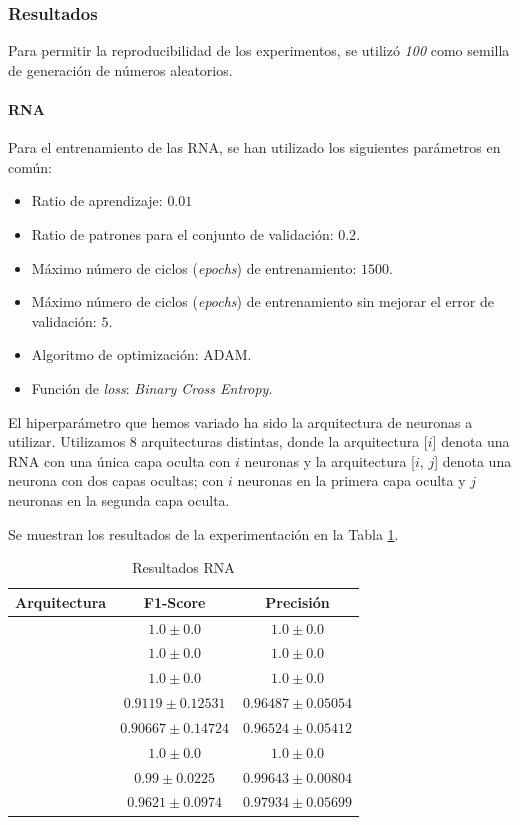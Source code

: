 \documentclass[12pt]{article}
\begin{document}
\subsubsection{Resultados}
Para permitir la reproducibilidad de los experimentos, se utilizó \textit{100} como semilla de generación de números
aleatorios.

\paragraph{RNA}

Para el entrenamiento de las RNA, se han utilizado los siguientes parámetros en común:
\begin{itemize}
	\item Ratio de aprendizaje: $0.01$
	\item Ratio de patrones para el conjunto de validación: $0.2$.
	\item Máximo número de ciclos (\textit{epochs}) de entrenamiento: $1500$.
	\item Máximo número de ciclos (\textit{epochs}) de entrenamiento sin mejorar el error de validación: $5$.
	\item Algoritmo de optimización: ADAM.
	\item Función de \textit{loss}: \textit{Binary Cross Entropy}.
\end{itemize}

El hiperparámetro que hemos variado ha sido la arquitectura de neuronas a utilizar.
Utilizamos 8 arquitecturas distintas,
donde la arquitectura [$i$] denota una RNA con una única capa oculta con $i$ neuronas y la arquitectura [$i$, $j$] 
denota una neurona con dos capas ocultas; con $i$ neuronas en la primera capa oculta y $j$ neuronas en la segunda capa oculta.

Se muestran los resultados de la experimentación en la Tabla \ref{Tab:ANN_1}.

\begin{table}[ht]
	\caption{Resultados RNA}
	\centering
		 \begin{tabular}{||c c c||}
			 \hline
			 Arquitectura & F1-Score & Precisión  \\ [0.5ex]
			 \hline\hline
			 [2] & $1.0 \pm 0.0$ & $1.0 \pm 0.0$ \\
			 \hline
			 [4] & $1.0 \pm 0.0$ & $1.0 \pm 0.0$ \\
			 \hline
			 [8] & $1.0 \pm 0.0$ & $1.0 \pm 0.0$ \\
			 \hline
			 [2, 4] & $0.9119 \pm 0.12531$ & $0.96487 \pm 0.05054$ \\
			 \hline
			 [2, 8] & $0.90667 \pm 0.14724$ & $0.96524 \pm 0.05412$ \\
			 \hline
			 [4, 2] & $1.0 \pm 0.0$ & $1.0 \pm 0.0$ \\
			 \hline
			 [4, 4] & $0.99 \pm 0.0225$ & $0.99643 \pm 0.00804$ \\
			 \hline
			 [4, 8] & $0.9621 \pm 0.0974$ & $0.97934 \pm 0.05699$ \\
			 \hline
		 \end{tabular}
	\label{Tab:ANN_1}
\end{table}
\end{document}
